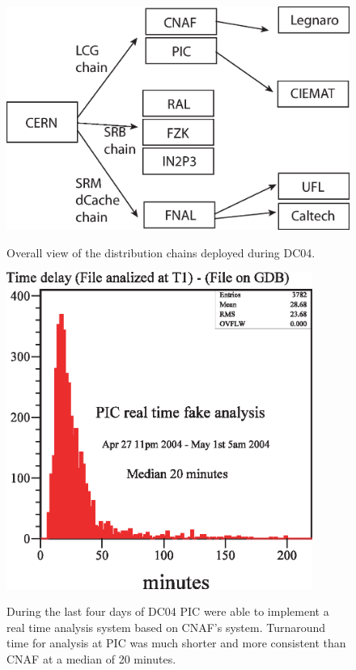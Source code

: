 \documentclass{cmspaper}
\begin{document}
\begin{figure}[tbp]
\centering
\includegraphics[width=15cm, angle = 90]{chains.eps}
\label{fig:chains}
\caption{Overall view of the distribution chains deployed during DC04.}
\end{figure}
\clearpage
\begin{figure}[tbp]
\centering
\includegraphics[width=10cm]{PIC-RTA.eps}
\label{fig:PIC-RTA}
\caption{During the last four days of DC04 PIC were able to implement
a real time analysis system based on CNAF's system. Turnaround time
for analysis at PIC was much shorter and more consistent than CNAF at
a median of 20 minutes. }
\end{figure}
\clearpage
\end{document}
